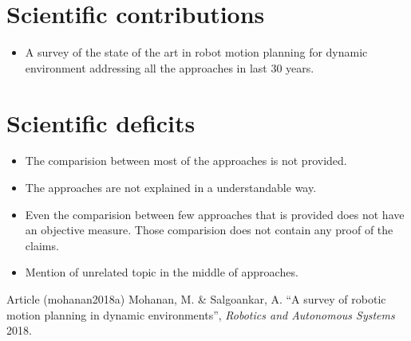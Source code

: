 \documentclass[12pt]{article}
\begin{document}
\section{Scientific contributions}
\begin{itemize}
    \item A survey of the state of the art in robot motion planning for dynamic environment addressing all the approaches in last 30 years.
\end{itemize}

\section{Scientific deficits}
\begin{itemize}
    \item The comparision between most of the approaches is not provided.
    \item The approaches are not explained in a understandable way.
    \item Even the comparision between few approaches that is provided does not have an objective measure. Those comparision does not contain any proof of the claims.
    \item Mention of unrelated topic in the middle of approaches.
\end{itemize}

\begin{thebibliography}{1}
     Article (mohanan2018a) Mohanan, M. \& Salgoankar, A. ``A survey of robotic motion planning in dynamic environments'', \textit{Robotics and Autonomous Systems} 2018.
\end{thebibliography}
\end{document}
